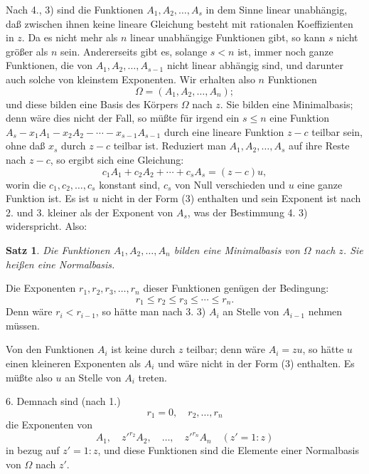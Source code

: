 \documentclass[12pt,a4paper]{article}
\newtheorem*{satz}{Satz}
\begin{document}
Nach 4., 3) sind die Funktionen $A_1, A_2, \ldots, A_s$ in dem Sinne linear unabhängig, daß zwischen ihnen keine lineare Gleichung besteht mit rationalen Koeffizienten in $z$. Da es nicht mehr als $n$ linear unabhängige Funktionen gibt, so kann $s$ nicht größer als $n$ sein. Andererseits gibt es, solange $s < n$ ist, immer noch ganze Funktionen, die von $A_1, A_2, \ldots, A_{s-1}$ nicht linear abhängig sind, und darunter auch solche von kleinstem Exponenten. Wir erhalten also $n$ Funktionen
\begin{equation}\label{eq:193-4}
\Omega = (A_1, A_2, \ldots, A_n);
\end{equation}
und diese bilden eine Basis des Körpers $\Omega$ nach $z$. Sie bilden eine Minimalbasis; denn wäre dies nicht der Fall, so müßte für irgend ein $s \leq n$ eine Funktion $A_s - x_1 A_1 - x_2 A_2 - \cdots - x_{s-1} A_{s-1}$ durch eine lineare Funktion $z - c$ teilbar sein, ohne daß $x_s$ durch $z-c$ teilbar ist. Reduziert man $A_1, A_2, \ldots, A_s$ auf ihre Reste nach $z-c$, so ergibt sich eine Gleichung:
\[
c_1 A_1 + c_2 A_2 + \cdots + c_s A_s = (z-c)u,
\]
worin die $c_1, c_2, \ldots, c_s$ konstant sind, $c_s$ von Null verschieden und $u$ eine ganze Funktion ist. Es ist $u$ nicht in der Form (3) enthalten und sein Exponent ist nach 2. und 3. kleiner als der Exponent von $A_s$, was der Bestimmung 4. 3) widerspricht. Also:

\begin{satz}
Die Funktionen $A_1, A_2, \ldots, A_n$ bilden eine \emph{Minimalbasis} von $\Omega$ nach $z$. Sie heißen eine \emph{Normalbasis}.
\end{satz}

Die Exponenten $r_1, r_2, r_3, \ldots, r_n$ dieser Funktionen genügen der Bedingung:
\begin{equation}\label{eq:193-5}
r_1 \leq r_2 \leq r_3 \leq \cdots \leq r_n.
\end{equation}
Denn wäre $r_i < r_{i-1}$, so hätte man nach 3. 3) $A_i$ an Stelle von $A_{i-1}$ nehmen müssen.

Von den Funktionen $A_i$ ist keine durch $z$ teilbar; denn wäre $A_i = zu$, so hätte $u$ einen kleineren Exponenten als $A_i$ und wäre nicht in der Form (3) enthalten. Es müßte also $u$ an Stelle von $A_i$ treten.

6. Demnach sind (nach 1.)
\[
r_1 = 0, \quad r_2, \ldots, r_n
\]
die Exponenten von
\begin{equation}\label{eq:193-6}
A_1, \quad z'^{r_2} A_2, \quad \ldots, \quad z'^{r_n} A_n \quad (z' = 1:z)
\end{equation}
in bezug auf $z' = 1:z$, und diese Funktionen sind die Elemente einer Normalbasis von $\Omega$ nach $z'$.
\end{document}
